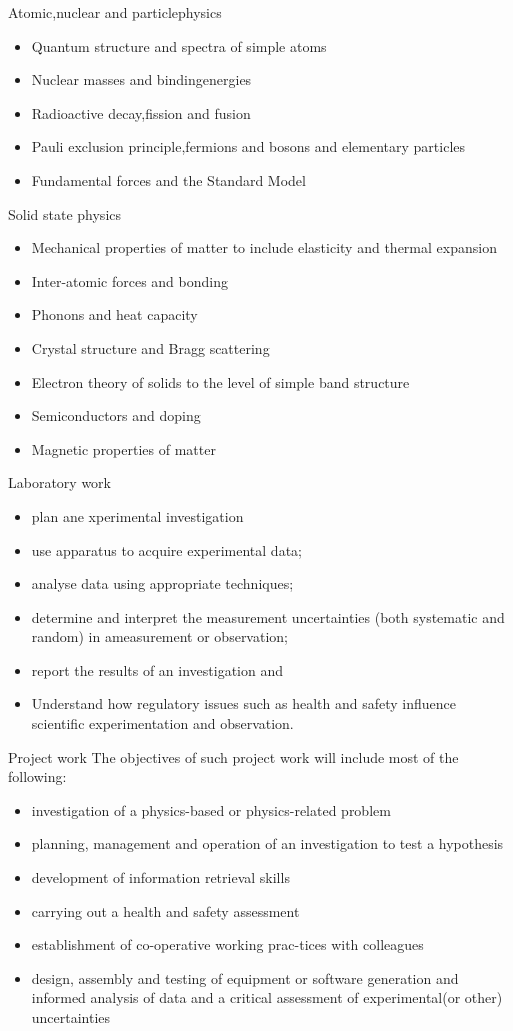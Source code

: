 \documentclass[a4paper, oneside, 12pt]{memoir}
\begin{document}
Atomic,nuclear and particlephysics
\begin{itemize}
    \item Quantum structure and spectra of simple atoms
    \item Nuclear masses and bindingenergies
    \item Radioactive decay,fission and fusion
    \item Pauli exclusion principle,fermions and bosons and elementary particles
    \item Fundamental forces and the Standard Model
\end{itemize}
Solid state physics
\begin{itemize}
    \item Mechanical properties of matter to include elasticity and thermal expansion
    \item Inter-atomic forces and bonding
    \item Phonons and heat capacity
    \item Crystal structure and Bragg scattering
    \item Electron theory of solids to the level of simple band structure
    \item Semiconductors and doping 
    \item Magnetic properties of matter
\end{itemize}
Laboratory work
\begin{itemize}
    \item plan ane xperimental investigation
    \item use apparatus to acquire experimental data;
    \item analyse data using appropriate techniques;
    \item determine and interpret the measurement uncertainties (both systematic and random) in ameasurement or observation;
    \item report the results of an investigation and
    \item Understand how regulatory issues such as health and safety influence scientific experimentation and observation.
\end{itemize}
Project work
The objectives of such project work will include most of the following:
\begin{itemize}
    \item investigation of a physics-based or physics-related problem
    \item planning, management and operation of an investigation to test a hypothesis
    \item development of information retrieval skills
    \item carrying out a health and safety assessment
    \item establishment of co-operative working prac-tices with colleagues
    \item design, assembly and testing of equipment or software generation and informed analysis of data and a critical assessment of experimental(or other) uncertainties
\end{itemize}
\end{document}

